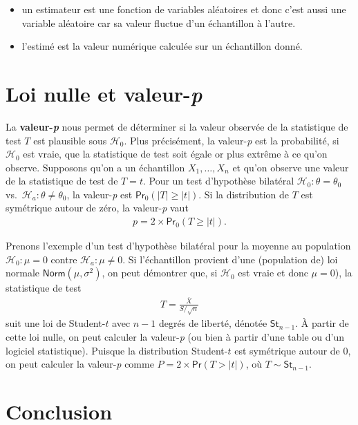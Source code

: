 \documentclass[
  11pt,
  letterpaper,
]{scrbook}
\providecommand{\tightlist}{%
  \setlength{\itemsep}{0pt}\setlength{\parskip}{0pt}}\usepackage{longtable,booktabs,array}
\theoremstyle{definition}
\theoremstyle{definition}
\theoremstyle{remark}
\begin{document}
\begin{itemize}
\tightlist
\item
  un estimateur est une fonction de variables aléatoires et donc c'est
  aussi une variable aléatoire car sa valeur fluctue d'un échantillon à
  l'autre.
\item
  l'estimé est la valeur numérique calculée sur un échantillon donné.
\end{itemize}

\section{\texorpdfstring{Loi nulle et
valeur-\emph{p}}{Loi nulle et valeur-p}}\label{loi-nulle-et-valeur-p}

La \textbf{valeur-\emph{p}} nous permet de déterminer si la valeur
observée de la statistique de test \(T\) est plausible sous
\(\mathscr{H}_0\). Plus précisément, la valeur-\emph{p} est la
probabilité, si \(\mathscr{H}_0\) est vraie, que la statistique de test
soit égale or plus extrême à ce qu'on observe. Supposons qu'on a un
échantillon \(X_1, \ldots, X_n\) et qu'on observe une valeur de la
statistique de test de \(T=t\). Pour un test d'hypothèse bilatéral
\(\mathscr{H}_0:\theta=\theta_0\)
vs.~\(\mathscr{H}_a:\theta \neq \theta_0\), la valeur-\emph{p} est
\(\mathsf{Pr}_0(|T| \geq |t|)\). Si la distribution de \(T\) est
symétrique autour de zéro, la valeur-\emph{p} vaut \begin{align*}
p = 2 \times \mathsf{Pr}_0(T \geq |t|).
\end{align*}

Prenons l'exemple d'un test d'hypothèse bilatéral pour la moyenne au
population \(\mathscr{H}_0:\mu=0\) contre \(\mathscr{H}_a:\mu \neq 0\).
Si l'échantillon provient d'une (population de) loi normale
\(\mathsf{Norm}(\mu, \sigma^2)\), on peut démontrer que, si
\(\mathscr{H}_0\) est vraie et donc \(\mu=0\)), la statistique de test
\begin{align*}
T = \frac{\overline{X}}{S/\sqrt{n}}
\end{align*} suit une loi de Student-\(t\) avec \(n-1\) degrés de
liberté, dénotée \(\mathsf{St}_{n-1}\). À partir de cette loi nulle, on
peut calculer la valeur-\emph{p} (ou bien à partir d'une table ou d'un
logiciel statistique). Puisque la distribution Student-\(t\) est
symétrique autour de \(0\), on peut calculer la valeur-\emph{p} comme
\(P = 2\times\mathsf{Pr}(T > |t|)\), où \(T \sim \mathsf{St}_{n-1}\).

\section{Conclusion}\label{conclusion}
\end{document}
